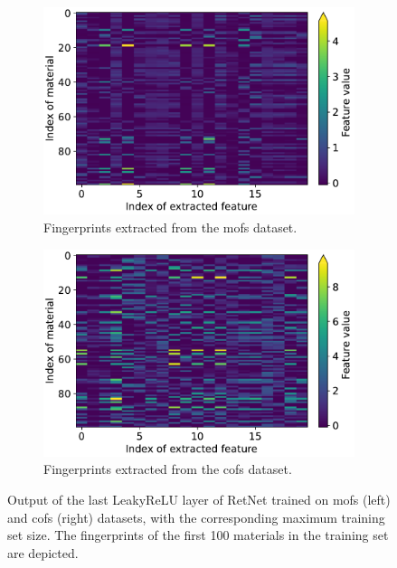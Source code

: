 \begin{figure}
	\centering
	\begin{subfigure}[b]{0.49\textwidth}
		\includegraphics[width=\textwidth]{fig/extracted_features_mofs.pdf}
		\caption{Fingerprints extracted from the \glspl{mof} dataset.}
	\end{subfigure}
	\begin{subfigure}[b]{0.49\textwidth}
		\includegraphics[width=\textwidth]{fig/extracted_features_cofs.pdf}
		\caption{Fingerprints extracted from the \glspl{cof} dataset.}
	\end{subfigure}
	\caption[Fingerprints extracted from RetNet.]{Output of the last LeakyReLU
	layer of RetNet trained on \glspl{mof} (left) and \glspl{cof} (right)
	datasets, with the corresponding maximum training set size. The fingerprints
	of the first \num{100} materials in the training set are depicted.}
	\label{fig:fingerprints}
\end{figure}

